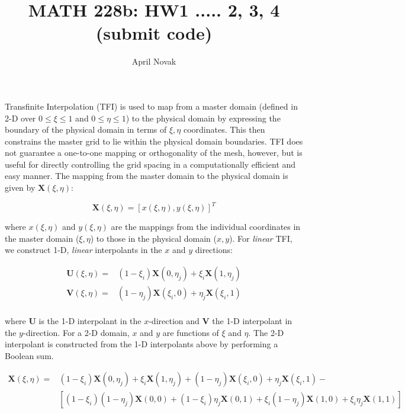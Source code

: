 \documentclass[10pt]{article}
\begin{document}
\title{MATH 228b: HW1 ..... 2, 3, 4 (submit code)}
\author{April Novak}

\maketitle

\section{}

Transfinite Interpolation (TFI) is used to map from a master domain (defined in 2-D over \(0\leq\xi\leq1\) and \(0\leq\eta\leq1\)) to the physical domain by expressing the boundary of the physical domain in terms of \(\xi,\eta\) coordinates. This then constrains the master grid to lie within the physical domain boundaries. TFI does not guarantee a one-to-one mapping or orthogonality of the mesh, however, but is useful for directly controlling the grid spacing in a computationally efficient and easy manner. The mapping from the master domain to the physical domain is given by \(\textbf{X}(\xi,\eta)\):

\begin{equation}
\textbf{X}(\xi,\eta)=\left\lbrack x(\xi,\eta), y(\xi,\eta)\right\rbrack^T
\end{equation}

where \(x(\xi,\eta)\) and \(y(\xi,\eta)\) are the mappings from the individual coordinates in the master domain (\(\xi,\eta\)) to those in the physical domain (\(x,y\)). For \textit{linear} TFI, we construct 1-D, \textit{linear} interpolants in the \(x\) and \(y\) directions:

\begin{equation}
\begin{aligned}
\textbf{U}(\xi,\eta)=& (1-\xi_i)\textbf{X}(0,\eta_j)+\xi_i\textbf{X}(1,\eta_j)\\
\textbf{V}(\xi,\eta)=& (1-\eta_j)\textbf{X}(\xi_i,0)+\eta_j\textbf{X}(\xi_i,1)\\
\end{aligned}
\end{equation}

where \(\textbf{U}\) is the 1-D interpolant in the \(x\)-direction and \(\textbf{V}\) the 1-D interpolant in the \(y\)-direction. For a 2-D domain, \(x\) and \(y\) are functions of \(\xi\) and \(\eta\). The 2-D interpolant is constructed from the 1-D interpolants above by performing a Boolean sum.

\begin{equation}
\begin{aligned}
\textbf{X}(\xi,\eta)=& (1-\xi_i)\textbf{X}(0,\eta_j)+\xi_i\textbf{X}(1,\eta_j) + (1-\eta_j)\textbf{X}(\xi_i,0)+\eta_j\textbf{X}(\xi_i,1) - \\
& \left\lbrack(1-\xi_i)(1-\eta_j)\textbf{X}(0,0)+(1-\xi_i)\eta_j\textbf{X}(0,1)+\xi_i(1-\eta_j)\textbf{X}(1,0)+\xi_i\eta_j\textbf{X}(1,1)\right\rbrack
\end{aligned}
\end{equation}
\end{document}
